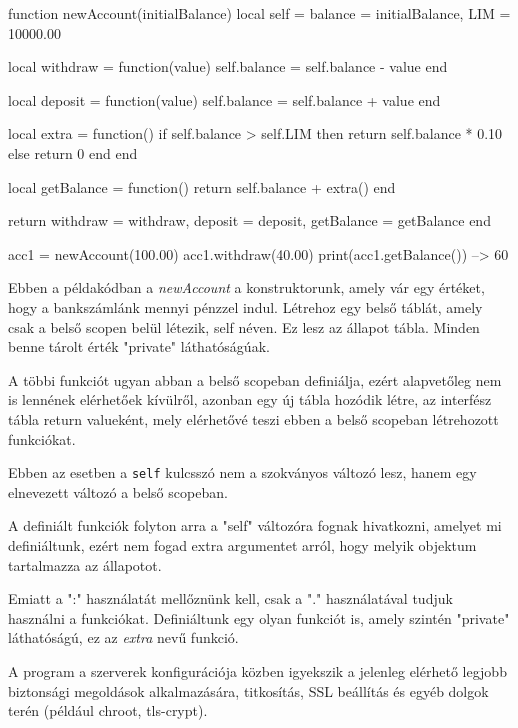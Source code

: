 \begin{lua}
function newAccount(initialBalance)
  local self = {balance = initialBalance, LIM = 10000.00}

  local withdraw = function(value)
    self.balance = self.balance - value
  end

  local deposit = function(value)
    self.balance = self.balance + value
  end
	
  local extra = function()
    if self.balance > self.LIM then
      return self.balance * 0.10
    else
      return 0
    end
  end

  local getBalance = function() return self.balance + extra() end

  return {
    withdraw = withdraw,
    deposit = deposit,
    getBalance = getBalance
  }
end

acc1 = newAccount(100.00)
acc1.withdraw(40.00)
print(acc1.getBalance())     --> 60
\end{lua}
Ebben a példakódban a \textit{newAccount} a konstruktorunk, amely vár egy értéket, hogy a bankszámlánk mennyi pénzzel indul. Létrehoz egy belső táblát, amely csak a belső scopen belül létezik, self néven. Ez lesz az állapot tábla. Minden benne tárolt érték "private" láthatóságúak. 

A többi funkciót ugyan abban a belső scopeban definiálja, ezért alapvetőleg nem is lennének elérhetőek kívülről, azonban egy új tábla hozódik létre, az interfész tábla return valueként, mely elérhetővé teszi ebben a belső scopeban létrehozott funkciókat.

Ebben az esetben a \texttt{self} kulcsszó nem a szokványos változó lesz, hanem egy elnevezett változó a belső scopeban. 

\pagebreak

A definiált funkciók folyton arra a "self" változóra fognak hivatkozni, amelyet mi definiáltunk, ezért nem fogad extra argumentet arról, hogy melyik objektum tartalmazza az állapotot.

Emiatt a ":" használatát mellőznünk kell, csak a "." használatával tudjuk használni a funkciókat. Definiáltunk egy olyan funkciót is, amely szintén "private" láthatóságú, ez az \textit{extra} nevű funkció. \cite {classes}

\label{sect:how_it_should_work}

A program a szerverek konfigurációja közben igyekszik a jelenleg elérhető legjobb biztonsági megoldások alkalmazására, titkosítás, SSL beállítás és egyéb dolgok terén (például chroot, tls-crypt).

